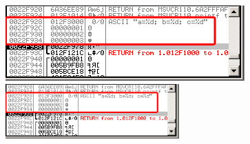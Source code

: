 \ifdefined\ebook
\includegraphics[width=\textwidth]{patterns/03_printf/x86/olly3_stack.png}
\else
\includegraphics[width=0.5\textwidth]{patterns/03_printf/x86/olly3_stack.png}
\fi
